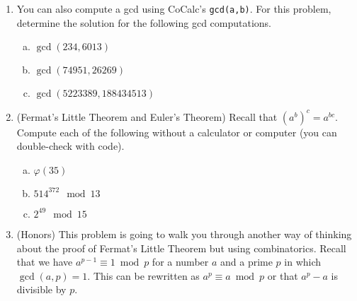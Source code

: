 \documentclass[12pt]{amsart}
\theoremstyle{plain}
\theoremstyle{definition}
\begin{document}
\begin{enumerate}[1.]
\begin{enumerate}[a.]
\begin{framed}
            \vspace{1.2in}
            \end{framed}
        \end{enumerate}
    \item You can also compute a gcd using CoCalc's \texttt{gcd(a,b)}.  For this problem, determine the solution for the following gcd computations.
		\begin{enumerate}[a.]
			\item $\gcd(234,6013)$
			\begin{framed}
			\vspace{.3in}
			\end{framed}
			\item $\gcd(74951,26269)$
			\begin{framed}
			\vspace{.3in}
			\end{framed}
			\item $\gcd(5223389,188434513)$
			\begin{framed}
			\vspace{.3in}
			\end{framed}
		\end{enumerate}
\item (Fermat's Little Theorem and Euler's Theorem) Recall that $(a^b)^c = a^{bc}$.  Compute each of the following without a calculator or computer (you can double-check with code).
		\begin{enumerate}[a.]
			\item $\varphi(35)$
			\begin{framed}
			\vspace{.5in}
			\end{framed}
			\item $514^{372} \mod 13$
			\begin{framed}
			\vspace{.5in}
			\end{framed}
			\item $2^{49} \mod 15$
			\begin{framed}
			\vspace{.5in}
			\end{framed}
		\end{enumerate}
\item (Honors) This problem is going to walk you through another way of thinking about the proof of Fermat's Little Theorem but using combinatorics.  Recall that we have $a^{p-1} \equiv 1 \bmod p$ for a number $a$ and a prime $p$ in which $\gcd(a,p) = 1$.  This can be rewritten as $a^p \equiv a \bmod p$ or that $a^p - a$ is divisible by $p$.

\end{enumerate}
\end{document}
